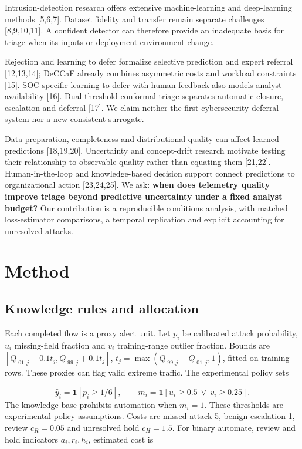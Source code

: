 \documentclass[11pt,letterpaper]{article}
\begin{document}
Intrusion-detection research offers extensive machine-learning and deep-learning methods {[}5,6,7{]}. Dataset fidelity and transfer remain separate challenges {[}8,9,10,11{]}. A confident detector can therefore provide an inadequate basis for triage when its inputs or deployment environment change.

Rejection and learning to defer formalize selective prediction and expert referral {[}12,13,14{]}; DeCCaF already combines asymmetric costs and workload constraints {[}15{]}. SOC-specific learning to defer with human feedback also models analyst availability {[}16{]}. Dual-threshold conformal triage separates automatic closure, escalation and deferral {[}17{]}. We claim neither the first cybersecurity deferral system nor a new consistent surrogate.

Data preparation, completeness and distributional quality can affect learned predictions {[}18,19,20{]}. Uncertainty and concept-drift research motivate testing their relationship to observable quality rather than equating them {[}21,22{]}. Human-in-the-loop and knowledge-based decision support connect predictions to organizational action {[}23,24,25{]}. We ask: \textbf{when does telemetry quality improve triage beyond predictive uncertainty under a fixed analyst budget?} Our contribution is a reproducible conditions analysis, with matched loss-estimator comparisons, a temporal replication and explicit accounting for unresolved attacks.

\section{Method}
\subsection{Knowledge rules and allocation}
Each completed flow is a proxy alert unit. Let \(p_i\) be calibrated attack probability, \(u_i\) missing-field fraction and \(v_i\) training-range outlier fraction. Bounds are \([Q_{.01,j}-0.1t_j,Q_{.99,j}+0.1t_j]\), \(t_j=\max(Q_{.99,j}-Q_{.01,j},1)\), fitted on training rows. These proxies can flag valid extreme traffic. The experimental policy sets

\begin{equation}\hat y_i=\mathbf{1}[p_i\ge1/6],\qquad m_i=\mathbf{1}[u_i\ge0.5\ \lor\ v_i\ge0.25].\end{equation}
The knowledge base prohibits automation when \(m_i=1\). These thresholds are experimental policy assumptions. Costs are missed attack 5, benign escalation 1, review \(c_R=0.05\) and unresolved hold \(c_H=1.5\). For binary automate, review and hold indicators \(a_i,r_i,h_i\), estimated cost is
\end{document}
